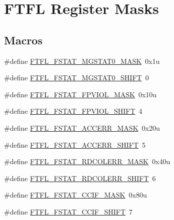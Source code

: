 \hypertarget{group___f_t_f_l___register___masks}{}\section{F\+T\+FL Register Masks}
\label{group___f_t_f_l___register___masks}
\subsection*{Macros}
\begin{DoxyCompactItemize}
\item 
\#define \hyperlink{group___f_t_f_l___register___masks_gad88c4e31804691b13fa67b4e36bca9ae}{F\+T\+F\+L\+\_\+\+F\+S\+T\+A\+T\+\_\+\+M\+G\+S\+T\+A\+T0\+\_\+\+M\+A\+SK}~0x1u
\item 
\#define \hyperlink{group___f_t_f_l___register___masks_gae33faa3f10ce55c1955c3bc20190e189}{F\+T\+F\+L\+\_\+\+F\+S\+T\+A\+T\+\_\+\+M\+G\+S\+T\+A\+T0\+\_\+\+S\+H\+I\+FT}~0
\item 
\#define \hyperlink{group___f_t_f_l___register___masks_ga01be669b3badf964a2db479cc61155b1}{F\+T\+F\+L\+\_\+\+F\+S\+T\+A\+T\+\_\+\+F\+P\+V\+I\+O\+L\+\_\+\+M\+A\+SK}~0x10u
\item 
\#define \hyperlink{group___f_t_f_l___register___masks_ga45d86da8dc4233e6882aad64743b3449}{F\+T\+F\+L\+\_\+\+F\+S\+T\+A\+T\+\_\+\+F\+P\+V\+I\+O\+L\+\_\+\+S\+H\+I\+FT}~4
\item 
\#define \hyperlink{group___f_t_f_l___register___masks_ga5ce6aed459fb58e0c75f6b46a34dc3e3}{F\+T\+F\+L\+\_\+\+F\+S\+T\+A\+T\+\_\+\+A\+C\+C\+E\+R\+R\+\_\+\+M\+A\+SK}~0x20u
\item 
\#define \hyperlink{group___f_t_f_l___register___masks_ga96524c0503f7920b242fd345e33246d6}{F\+T\+F\+L\+\_\+\+F\+S\+T\+A\+T\+\_\+\+A\+C\+C\+E\+R\+R\+\_\+\+S\+H\+I\+FT}~5
\item 
\#define \hyperlink{group___f_t_f_l___register___masks_ga8aa3ae8a1526551f7f85657da0524ba2}{F\+T\+F\+L\+\_\+\+F\+S\+T\+A\+T\+\_\+\+R\+D\+C\+O\+L\+E\+R\+R\+\_\+\+M\+A\+SK}~0x40u
\item 
\#define \hyperlink{group___f_t_f_l___register___masks_ga5e3cd3ca714a0f565cd8faf77c8dbc93}{F\+T\+F\+L\+\_\+\+F\+S\+T\+A\+T\+\_\+\+R\+D\+C\+O\+L\+E\+R\+R\+\_\+\+S\+H\+I\+FT}~6
\item 
\#define \hyperlink{group___f_t_f_l___register___masks_gad156c3b7ab8792f982703b7353612b01}{F\+T\+F\+L\+\_\+\+F\+S\+T\+A\+T\+\_\+\+C\+C\+I\+F\+\_\+\+M\+A\+SK}~0x80u
\item 
\#define \hyperlink{group___f_t_f_l___register___masks_ga62035ccf898d9dd64ce71697fb22491e}{F\+T\+F\+L\+\_\+\+F\+S\+T\+A\+T\+\_\+\+C\+C\+I\+F\+\_\+\+S\+H\+I\+FT}~7

\end{DoxyCompactItemize}
